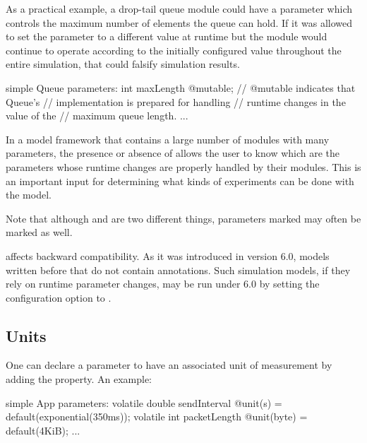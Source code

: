 As a practical example, a drop-tail queue module could have a 
parameter which controls the maximum number of elements the queue can hold. If
it was allowed to set the  parameter to a different value at
runtime but the module would continue to operate according to the initially
configured value throughout the entire simulation, that could falsify simulation
results.

\begin{ned}
simple Queue
{
    parameters:
        int maxLength @mutable; // @mutable indicates that Queue's
                                // implementation is prepared for handling
                                // runtime changes in the value of the
                                // maximum queue length.
        ...
}
\end{ned}

In a model framework that contains a large number of modules with many
parameters, the presence or absence of  allows the user to know
which are the parameters whose runtime changes are properly handled by their
modules. This is an important input for determining what kinds of experiments
can be done with the model.

\begin{hint}
    Note that although  and  are two
    different things, parameters marked  may often be marked
     as well.
\end{hint}

\begin{note}
     affects backward compatibility. As it was introduced in
    {\opp} version 6.0, models written before that do not contain
     annotations. Such simulation models, if they rely on
    runtime parameter changes, may be run under {\opp} 6.0 by setting the
     configuration option to .
\end{note}


\subsection{Units}
\label{sec:ned-lang:units}

One can declare a parameter to have an associated unit of measurement by adding
the  property. An example:

\begin{ned}
simple App
{
    parameters:
        volatile double sendInterval @unit(s) = default(exponential(350ms));
        volatile int packetLength @unit(byte) = default(4KiB);
    ...
}
\end{ned}

